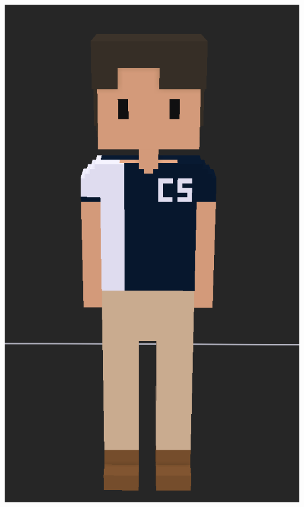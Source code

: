\documentclass[13.5pt,aspecratio=169, xcolor=dvipsnames]{beamer}
\begin{document}
\begin{frame}
\begin{minipage}{0.49\textwidth}
        \includegraphics[height=0.85\textheight]{CS_er_model.png}
\end{minipage}
\end{frame}
    
\end{document}
